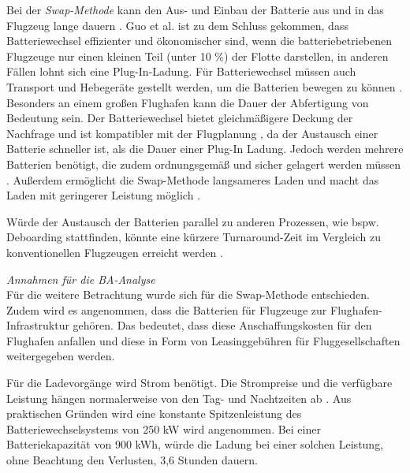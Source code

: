 Bei der \textit{Swap-Methode} kann den Aus- und Einbau der Batterie aus 
und in das Flugzeug lange dauern \cite{dalmia2022powering}. 
Guo et al. \cite{guo2020aviation} ist zu dem Schluss gekommen, 
dass Batteriewechsel effizienter und ökonomischer sind, 
wenn die batteriebetriebenen Flugzeuge nur einen kleinen Teil (unter 10 \%) der Flotte darstellen, 
in anderen Fällen lohnt sich eine Plug-In-Ladung. 
Für Batteriewechsel müssen auch Transport und Hebegeräte gestellt werden, 
um die Batterien bewegen zu können \cite{reimers2018introduction}.
Besonders an einem großen Flughafen kann die Dauer der Abfertigung von Bedeutung sein.
Der Batteriewechsel bietet gleichmäßigere Deckung der Nachfrage \cite{guo2020aviation} 
und ist kompatibler mit der Flugplanung \cite{salucci2020optimal}, 
da der Austausch einer Batterie schneller ist, als die Dauer einer Plug-In Ladung. 
Jedoch werden mehrere Batterien benötigt, 
die zudem ordnungsgemäß und sicher gelagert werden müssen \cite{salucci2020optimal}.
Außerdem ermöglicht die Swap-Methode langsameres Laden und macht 
das Laden mit geringerer Leistung möglich \cite{avogadro2024demystifying}.

Würde der Austausch der Batterien parallel zu anderen Prozessen, 
wie bspw. Deboarding stattfinden, könnte eine kürzere Turnaround-Zeit im 
Vergleich zu konventionellen Flugzeugen erreicht werden \cite{schmidt2016challenges}.

\textit{Annahmen für die BA-Analyse}\\
%
Für die weitere Betrachtung wurde sich für die Swap-Methode entschieden. 
Zudem wird es angenommen, dass die Batterien für Flugzeuge zur Flughafen-Infrastruktur gehören.
Das bedeutet, dass diese Anschaffungskosten für den Flughafen anfallen 
und diese in Form von Leasinggebühren für Fluggesellschaften weitergegeben werden.

Für die Ladevorgänge wird Strom benötigt. 
Die Strompreise und die verfügbare Leistung hängen normalerweise 
von den Tag- und Nachtzeiten ab \cite{salucci2020optimal}. 
Aus praktischen Gründen wird eine konstante Spitzenleistung des Batteriewechselsystems von 250 kW wird angenommen. 
Bei einer Batteriekapazität von 900 kWh, würde die Ladung bei einer solchen Leistung, 
ohne Beachtung den Verlusten, 3,6 Stunden dauern.

